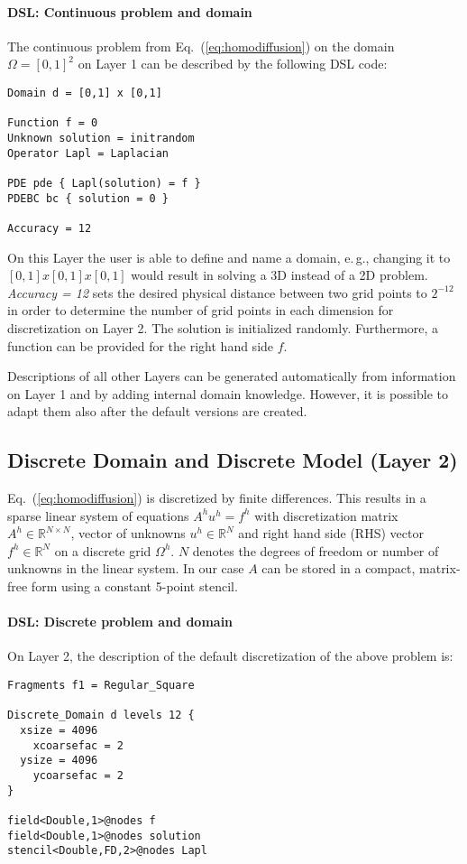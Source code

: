 \documentclass[onecolumn]{svjour3}
\newcommand{\refeqn}[1]{(\ref{#1})}
\begin{document}
\paragraph{DSL: Continuous problem and domain} The continuous problem from Eq.~\refeqn{eq:homodiffusion} on the domain $\Omega = [0,1]^2$ on Layer 1 can be described by the following DSL code:
\begin{verbatim} 
Domain d = [0,1] x [0,1]

Function f = 0
Unknown solution = initrandom
Operator Lapl = Laplacian

PDE pde { Lapl(solution) = f } 
PDEBC bc { solution = 0 }

Accuracy = 12
\end{verbatim}
On this Layer the user is able to define and name a domain, e.\,g., changing it to $[0,1] x [0,1] x [0,1]$ would result in solving a 3D instead of a 2D problem. \textit{Accuracy = 12} sets the desired physical distance between two grid points to $2^{-12}$ in order to determine the number of grid points in each dimension for discretization on Layer 2. The solution is initialized randomly. Furthermore, a function can be provided for the
right hand side $f$. 

Descriptions of all other Layers can be generated automatically from information on Layer 1 and by adding internal domain knowledge. However, it is possible to adapt them also after the default versions are created. 

\subsection{Discrete Domain and Discrete Model (Layer 2)}

Eq.~(\ref{eq:homodiffusion}) is discretized by finite differences. 
This results in a sparse linear system of equations $A^h u^h = f^h$
with discretization matrix $A^h \in \mathbb{R}^{N \times N}$, vector of unknowns $u^h \in \mathbb{R}^N$ 
and right hand side (RHS) vector $f^h \in \mathbb{R}^N$ on a discrete grid $\Omega^h$. 
$N$ denotes the degrees of freedom or number of unknowns in the linear system.
In our case $A$ can be stored in a compact, matrix-free form using a constant 
5-point stencil. 

\paragraph{DSL: Discrete problem and domain} On Layer 2, the description of the default discretization of the above problem is:
\begin{verbatim} 
Fragments f1 = Regular_Square

Discrete_Domain d levels 12 { 
  xsize = 4096 
	xcoarsefac = 2
  ysize = 4096  
	ycoarsefac = 2
} 

field<Double,1>@nodes f  
field<Double,1>@nodes solution  
stencil<Double,FD,2>@nodes Lapl  
\end{verbatim}
\end{document}
